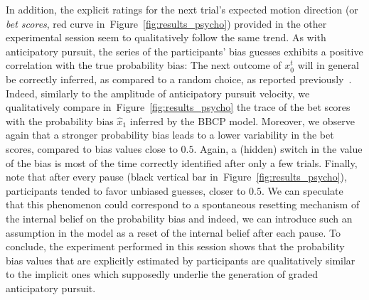 \documentclass[10pt,letterpaper]{article}
\newcommand{\citep}[1]{\cite{#1}}
\newcommand{\seeFig}[1]{Figure~\ref{fig:#1}}
\begin{document}
In addition, the explicit ratings
for the next trial's expected motion direction (or \textit{bet scores}, red curve in~\seeFig{results_psycho})
provided in the other experimental session
seem to qualitatively follow the same trend.
As with anticipatory pursuit, the series of the participants' bias guesses
exhibits a positive correlation with the true probability bias:
The next outcome of $x_{0}^{t}$ will in general be correctly inferred,
as compared to a random choice, as reported previously~\citep{Meyniel15}.
Indeed, similarly to the amplitude of anticipatory pursuit velocity,
we qualitatively compare in~\seeFig{results_psycho}
the trace of the bet scores
with the probability bias $\hat{x}_1$ inferred by the BBCP model.
Moreover, we observe again that a stronger probability bias leads
to a lower variability in the bet scores, compared to bias values close to $0.5$.
Again, a (hidden) switch in the value of the bias is
most of the time correctly identified after only a few trials.
Finally, note that after every pause (black vertical bar in~\seeFig{results_psycho}),
participants tended to favor unbiased guesses, closer to $0.5$.
We can speculate that this phenomenon could correspond
to a spontaneous resetting mechanism of the internal belief on the probability bias
and indeed, we can introduce such an assumption in the model
as a reset of the internal belief after each pause.
To conclude, the experiment performed in this session
shows that the probability bias values that are explicitly estimated by participants
are qualitatively similar to the implicit ones
which supposedly underlie the generation of graded anticipatory pursuit.
\end{document}
